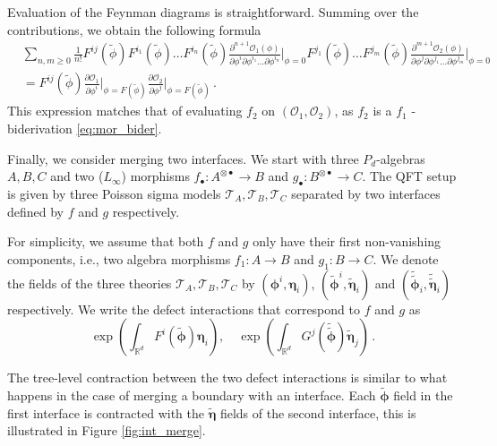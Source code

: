 \documentclass[11pt]{article}
\numberwithin{equation}{section}
\begin{document}
Evaluation of the Feynman diagrams is straightforward. Summing over the contributions, we obtain the following formula
\begin{equation}
\begin{aligned}
&\sum_{n,m\geq 0}\frac{1}{n!}F^{ij}(\widetilde{\phi})F^{i_1}(\widetilde{\phi})\dots F^{i_n}(\widetilde{\phi})\frac{\partial^{n+1} \mathcal{O}_1(\phi)}{\partial \phi^i \partial \phi^{i_1} \dots \partial \phi^{i_n}}\Big|_{\phi=0} F^{j_1}(\widetilde{\phi})\dots F^{j_m}(\widetilde{\phi})\frac{\partial^{m+1} \mathcal{O}_2(\phi)}{\partial \phi^j \partial \phi^{j_1} \dots \partial \phi^{j_m}}\Big|_{\phi=0} \\
&=  F^{ij}(\widetilde{\phi})\frac{\partial \mathcal{O}_1}{\partial \phi^i}\Big|_{\phi = F(\widetilde{\phi})}\frac{\partial \mathcal{O}_2}{\partial \phi^j}\Big|_{\phi = F(\widetilde{\phi})}\,.
\end{aligned}
\end{equation} 
This expression matches that of evaluating $f_2$ on $(\mathcal{O}_1,\mathcal{O}_2)$, as $f_2$ is a $f_1$ -biderivation \eqref{eq:mor_bider}.

Finally, we consider merging two interfaces. We start with three $P_d$-algebras $A,B,C$ and two ($L_\infty$) morphisms $f_{\bullet}:A^{\otimes \bullet}\to B$ and $g_{\bullet}:B^{\otimes \bullet}\to C$. The QFT setup is given by three Poisson sigma models $\mathcal{T}_A, \mathcal{T}_B, \mathcal{T}_C$ separated by two interfaces defined by $f$ and $g$ respectively. 

For simplicity, we assume that both $f$ and $g$ only have their first non-vanishing components, i.e., two algebra morphisms $f_1:A\to B$ and $g_1:B\to C$. We denote the fields of the three theories $\mathcal{T}_A, \mathcal{T}_B, \mathcal{T}_C$ by $(\boldsymbol{\phi}^i,\boldsymbol{\eta}_i)$, $(\widetilde{\boldsymbol{\phi}}^i,\widetilde{\boldsymbol{\eta}}_i)$ and $(\widetilde{\widetilde{\boldsymbol{\phi}}}_i,\widetilde{\widetilde{\boldsymbol{\eta}}}_i)$ respectively. We write the defect interactions that correspond to $f$ and $g$ as 
\begin{equation}
\exp\left(\int_{\mathbb{R}^d} F^i(\widetilde{\boldsymbol{\phi}})\boldsymbol{\eta}_i \right), \quad \exp\left(\int_{\mathbb{R}^d} G^j(\widetilde{\widetilde{\boldsymbol{\phi}}})\widetilde{\boldsymbol{\eta}}_j \right)\,.		
\end{equation}

The tree-level contraction between the two defect interactions is similar to what happens in the case of merging a boundary with an interface. Each $\widetilde{\boldsymbol{\phi}}$ field in the first interface is contracted with the $\widetilde{\boldsymbol{\eta}}$ fields of the second interface, this is illustrated in Figure \ref{fig:int_merge}.
\end{document}
